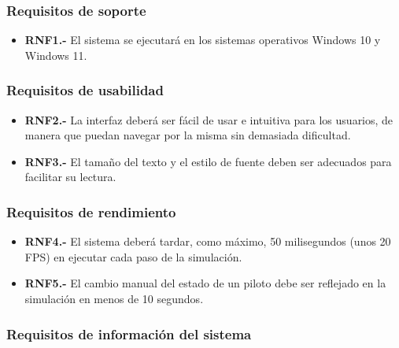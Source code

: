 \subsubsection{Requisitos de soporte}

\begin{itemize}
    \item \textbf{RNF1.-} El sistema se ejecutará en los sistemas operativos Windows 10 y Windows 11.
\end{itemize}

\subsubsection{Requisitos de usabilidad}

\begin{itemize}
    \item \textbf{RNF2.-} La interfaz deberá ser fácil de usar e intuitiva para los usuarios, de manera que puedan navegar por la misma sin demasiada dificultad.
    \item \textbf{RNF3.-} El tamaño del texto y el estilo de fuente deben ser adecuados para facilitar su lectura.
\end{itemize}

\subsubsection{Requisitos de rendimiento}

\begin{itemize}
    \item \textbf{RNF4.-} El sistema deberá tardar, como máximo, 50 milisegundos (unos 20 FPS) en ejecutar cada paso de la simulación.
    \item \textbf{RNF5.-} El cambio manual del estado de un piloto debe ser reflejado en la simulación en menos de 10 segundos.
\end{itemize}

\subsubsection{Requisitos de información del sistema}

